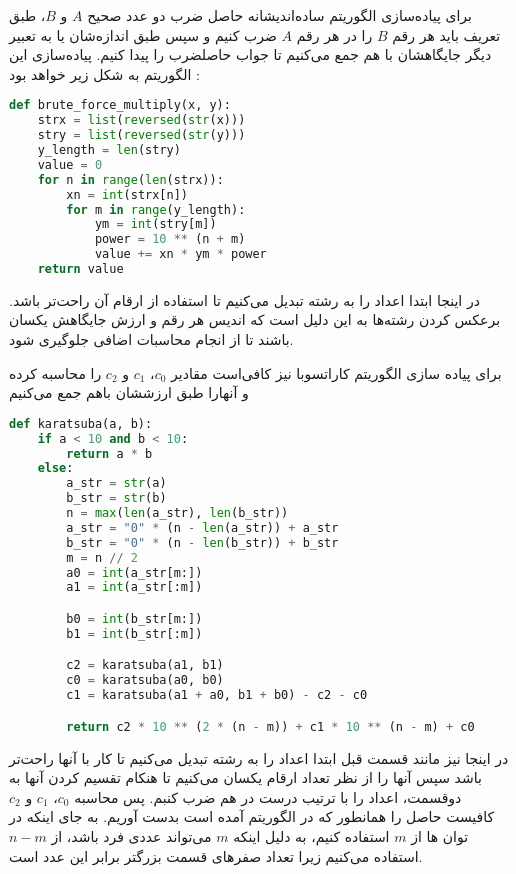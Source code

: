 \documentclass[]{article}
\begin{document}
برای پیاده‌سازی الگوریتم ساده‌اندیشانه حاصل ضرب دو عدد صحیح  $A$ و $B$، طبق تعریف باید
هر رقم $B$ را در هر رقم $A$ ضرب کنیم و سپس طبق اندازه‌شان یا به تعبیر دیگر جایگاهشان
با هم جمع می‌کنیم تا جواب حاصلضرب را پیدا کنیم.
پیاده‌سازی این الگوریتم به شکل زیر خواهد بود :
\begin{latin}
\begin{lstlisting}[language=python]
def brute_force_multiply(x, y):
    strx = list(reversed(str(x)))
    stry = list(reversed(str(y)))
    y_length = len(stry)
    value = 0
    for n in range(len(strx)):
        xn = int(strx[n])
        for m in range(y_length):
            ym = int(stry[m])
            power = 10 ** (n + m)
            value += xn * ym * power
    return value
\end{lstlisting}
\end{latin}
در اینجا ابتدا اعداد را به رشته تبدیل می‌کنیم تا استفاده از ارقام آن راحت‌تر باشد.
برعکس کردن رشته‌ها به‌ این دلیل است که اندیس هر رقم و ارزش جایگاهش یکسان باشند تا از
انجام محاسبات اضافی جلوگیری شود.

برای پیاده سازی الگوریتم کاراتسوبا نیز کافی‌است مقادیر $c_0$، $c_1$ و $c_2$ را
محاسبه کرده و آنها‌را طبق ارزششان باهم جمع می‌کنیم
\begin{latin}
\begin{lstlisting}[language=python]
def karatsuba(a, b):
    if a < 10 and b < 10:
        return a * b
    else:
        a_str = str(a)
        b_str = str(b)
        n = max(len(a_str), len(b_str))
        a_str = "0" * (n - len(a_str)) + a_str
        b_str = "0" * (n - len(b_str)) + b_str
        m = n // 2
        a0 = int(a_str[m:])
        a1 = int(a_str[:m])

        b0 = int(b_str[m:])
        b1 = int(b_str[:m])

        c2 = karatsuba(a1, b1)
        c0 = karatsuba(a0, b0)
        c1 = karatsuba(a1 + a0, b1 + b0) - c2 - c0

        return c2 * 10 ** (2 * (n - m)) + c1 * 10 ** (n - m) + c0
\end{lstlisting}
\end{latin}
در اینجا نیز مانند قسمت قبل ابتدا اعداد را به رشته تبدیل می‌کنیم تا کار با آنها راحت‌تر باشد سپس
آنها را از نظر تعداد ارقام یکسان می‌کنیم تا هنکام تقسیم کردن آنها به دوقسمت، اعداد را با ترتیب درست
در هم ضرب کنبم. پس محاسبه $c_0$، $c_1$ و $c_2$
کافیست حاصل را همانطور که در الگوریتم آمده است بدست آوریم.
به جای اینکه در توان ها از $m$ استفاده کنیم،
به دلیل اینکه $m$ می‌تواند عددی فرد باشد، از $n - m$
استفاده می‌کنیم زیرا تعداد صفر‌های قسمت بزرگتر برابر این عدد است. 
\end{document}
